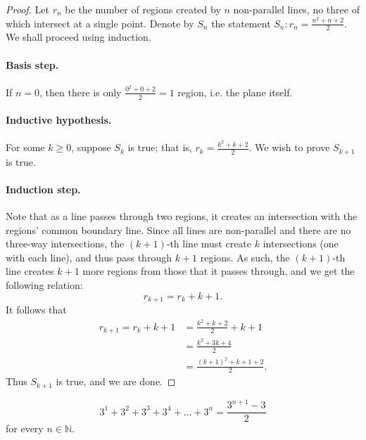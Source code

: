 \documentclass{exam}
\begin{document}
\begin{proof}
    Let $r_n$ be the number of regions created by $n$ non-parallel lines, no three of which intersect at a single point. Denote by $S_n$ the statement $S_n: r_n = \frac{n^2+n+2}2$. We shall proceed using induction.

    \paragraph{Basis step.} If $n=0$, then there is only $\frac{0^2+0+2}2=1$ region, i.e. the plane itself.

    \paragraph{Inductive hypothesis.} For some $k\ge0$, suppose $S_k$ is true; that is, $r_k = \frac{k^2+k+2}2$. We wish to prove $S_{k+1}$ is true.

    \paragraph{Induction step.} Note that as a line passes through two regions, it creates an intersection with the regions' common boundary line. Since all lines are non-parallel and there are no three-way intersections, the $(k+1)$-th line must create $k$ intersections (one with each line), and thus pass through $k+1$ regions. As such, the $(k+1)$-th line creates $k+1$ more regions from those that it passes through, and we get the following relation: $$r_{k+1} = r_k + k + 1.$$ It follows that
    \begin{align*}
        r_{k+1} = r_k + k + 1 &= \frac{k^2+k+2}2 + k + 1\\
        &=\frac{k^2 + 3k + 4}2\\
        &=\frac{(k+1)^2+k+1+2}2.
    \end{align*}
    Thus $S_{k+1}$ is true, and we are done.
\end{proof}

\begin{proposition}{10.34}
    $$3^1+3^2+3^3+3^4+\dots+3^n=\frac{3^{n+1}-3}2$$ for every $n\in\mathbb N$.
\end{proposition}
\end{document}
